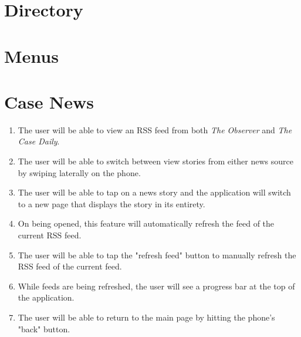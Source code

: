 \documentclass[pdftex,12pt,letter]{article}
\begin{document}
\section{Directory}
\section{Menus}
\section{Case News}
\begin{enumerate}[1.]
\item The user will be able to view an RSS feed from both \emph{The Observer} and \emph{The Case Daily}. 
\item The user will be able to switch between view stories from either news source by swiping laterally on the phone.
\item The user will be able to tap on a news story and the application will switch to a new page that displays the story in its entirety.
\item On being opened, this feature will automatically refresh the feed of the current RSS feed.
\item The user will be able to tap the "refresh feed" button to manually refresh the RSS feed of the current feed.
\item While feeds are being refreshed, the user will see a progress bar at the top of the application.
\item The user will be able to return to the main page by hitting the phone's "back" button.
\end{enumerate}
\end{document}
